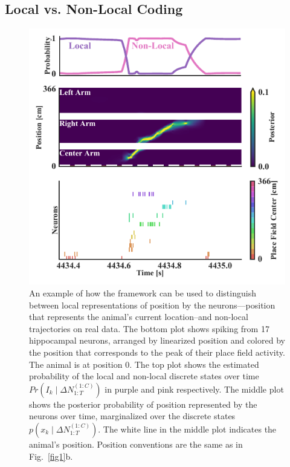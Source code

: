 \documentclass[conference]{IEEEtran}
\begin{document}
\subsection{Local vs. Non-Local Coding}
\begin{figure}[ht]
\centerline{\includegraphics{fig2.pdf}}
\caption{An example of how the framework can be used to distinguish between local representations of position by the neurons---position that represents the animal's current location--and non-local trajectories on real data. The bottom plot shows spiking from 17 hippocampal neurons, arranged by linearized position and colored by the position that corresponds to the peak of their place field activity. The animal is at position 0. The top plot shows the estimated probability of the local and non-local discrete states over time $Pr(I_{k} \mid \Delta N_{1:T}^{(1:C)})$ in purple and pink respectively. The middle plot shows the posterior probability of position represented by the neurons over time, marginalized over the discrete states $p(x_{k} \mid \Delta N_{1:T}^{(1:C)})$. The white line in the middle plot indicates the animal's position. Position conventions are the same as in Fig.~\ref{fig1}b.}
\label{fig2}
\end{figure}
\end{document}
